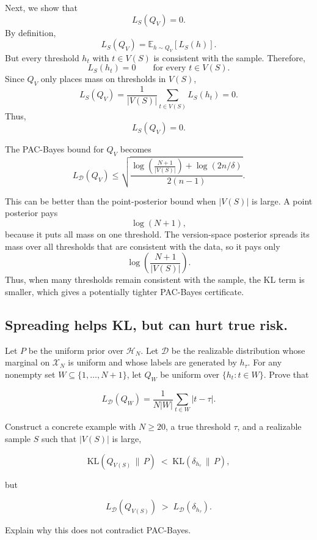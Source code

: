 \documentclass[11pt]{article}
\begin{document}
\begin{solutionbox}
Next, we show that
\[
L_S(Q_V)=0.
\]
By definition,
\[
L_S(Q_V)
=
\mathbb E_{h\sim Q_V}[L_S(h)].
\]
But every threshold $h_t$ with $t\in V(S)$ is consistent with the sample. Therefore,
\[
L_S(h_t)=0
\qquad
\text{for every } t\in V(S).
\]
Since $Q_V$ only places mass on thresholds in $V(S)$,
\[
L_S(Q_V)
=
\frac{1}{|V(S)|}\sum_{t\in V(S)}L_S(h_t)
=
0.
\]
Thus,
\[
\boxed{
L_S(Q_V)=0.
}
\]

The PAC-Bayes bound for $Q_V$ becomes
\[
L_{\mathcal D}(Q_V)
\le
\sqrt{
\frac{
\log\left(\frac{N+1}{|V(S)|}\right)+\log(2n/\delta)
}{
2(n-1)
}
}.
\]

This can be better than the point-posterior bound when $|V(S)|$ is large. A point posterior pays
\[
\log(N+1),
\]
because it puts all mass on one threshold. The version-space posterior spreads its mass over all thresholds that are consistent with the data, so it pays only
\[
\log\left(\frac{N+1}{|V(S)|}\right).
\]
Thus, when many thresholds remain consistent with the sample, the KL term is smaller, which gives a potentially tighter PAC-Bayes certificate.

\end{solutionbox}


\subsection{Spreading helps KL, but can hurt true risk.}
Let $P$ be the uniform prior over $\mathcal{H}_N$. Let $\mathcal{D}$ be the realizable 
distribution whose marginal on $\mathcal{X}_N$ is uniform and whose labels are generated 
by $h_\tau$. For any nonempty set $W \subseteq \{1,\dots, N+1\}$, let $Q_W$ be uniform 
over $\{ h_t : t \in W \}$. Prove that


\[
L_{\mathcal{D}}(Q_W)
=
\frac{1}{N |W|}
\sum_{t \in W} |t - \tau|.
\]



Construct a concrete example with $N \ge 20$, a true threshold $\tau$, and a realizable 
sample $S$ such that $|V(S)|$ is large,


\[
\mathrm{KL}(Q_{V(S)} \,\|\, P)
\;<\;
\mathrm{KL}(\delta_{h_\tau} \,\|\, P),
\]


but


\[
L_{\mathcal{D}}(Q_{V(S)})
\;>\;
L_{\mathcal{D}}(\delta_{h_\tau}).
\]



Explain why this does not contradict PAC-Bayes.
\end{document}
